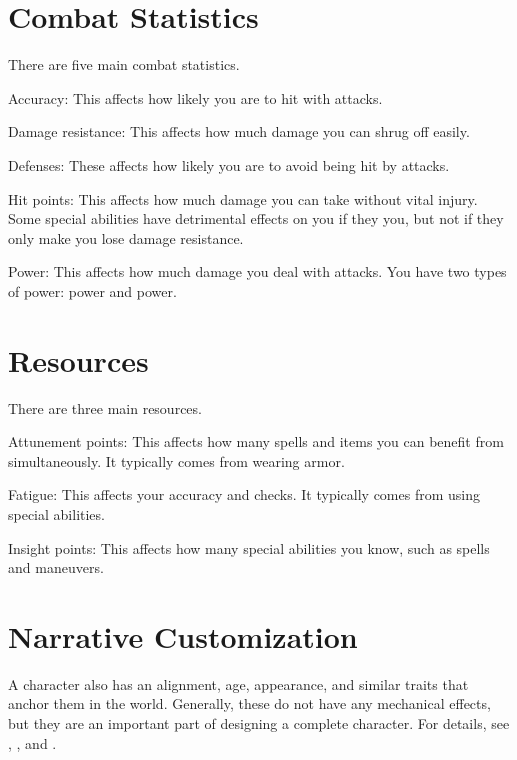 \section{Combat Statistics}\label{Combat Statistics}
  There are five main combat statistics.
  \begin{raggeditemize}
    \item Accuracy: This affects how likely you are to hit with attacks.
    \item Damage resistance: This affects how much damage you can shrug off easily.
    \item Defenses: These affects how likely you are to avoid being hit by attacks.
    \item Hit points: This affects how much damage you can take without vital injury.
      Some special abilities have detrimental effects on you if they  you, but not if they only make you lose damage resistance.
    \item Power: This affects how much damage you deal with attacks.
      You have two types of power: \magical power and  power.
  \end{raggeditemize}

\section{Resources}
  There are three main resources.
  \begin{raggeditemize}
    \item Attunement points: This affects how many spells and items you can benefit from simultaneously.
      It typically comes from wearing armor.
    \item Fatigue: This affects your accuracy and checks.
      It typically comes from using special abilities.
    \item Insight points: This affects how many special abilities you know, such as spells and maneuvers.
  \end{raggeditemize}

\section{Narrative Customization}
  A character also has an alignment, age, appearance, and similar traits that anchor them in the world.
  Generally, these do not have any mechanical effects, but they are an important part of designing a complete character.
  For details, see , , and .

